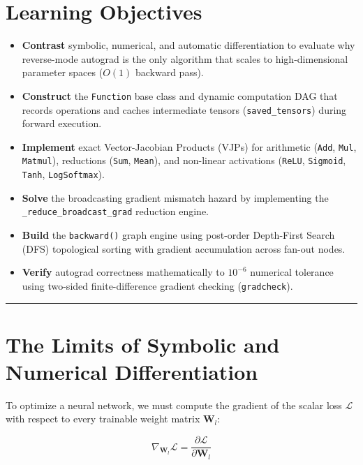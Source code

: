 \documentclass[
  letterpaper,
]{scrbook}
\providecommand{\tightlist}{%
  \setlength{\itemsep}{0pt}\setlength{\parskip}{0pt}}
\begin{document}
\section{Learning Objectives}\label{learning-objectives-6}

\begin{itemize}
\tightlist
\item
  \textbf{Contrast} symbolic, numerical, and automatic differentiation
  to evaluate why reverse-mode autograd is the only algorithm that
  scales to high-dimensional parameter spaces (\(O(1)\) backward pass).
\item
  \textbf{Construct} the \texttt{Function} base class and dynamic
  computation DAG that records operations and caches intermediate
  tensors (\texttt{saved\_tensors}) during forward execution.
\item
  \textbf{Implement} exact Vector-Jacobian Products (VJPs) for
  arithmetic (\texttt{Add}, \texttt{Mul}, \texttt{Matmul}), reductions
  (\texttt{Sum}, \texttt{Mean}), and non-linear activations
  (\texttt{ReLU}, \texttt{Sigmoid}, \texttt{Tanh}, \texttt{LogSoftmax}).
\item
  \textbf{Solve} the broadcasting gradient mismatch hazard by
  implementing the \texttt{\_reduce\_broadcast\_grad} reduction engine.
\item
  \textbf{Build} the \texttt{backward()} graph engine using post-order
  Depth-First Search (DFS) topological sorting with gradient
  accumulation across fan-out nodes.
\item
  \textbf{Verify} autograd correctness mathematically to \(10^{-6}\)
  numerical tolerance using two-sided finite-difference gradient
  checking (\texttt{gradcheck}).
\end{itemize}

\begin{center}\rule{0.5\linewidth}{0.5pt}\end{center}

\section{The Limits of Symbolic and Numerical
Differentiation}\label{the-limits-of-symbolic-and-numerical-differentiation}

To optimize a neural network, we must compute the gradient of the scalar
loss \(\mathcal{L}\) with respect to every trainable weight matrix
\(\mathbf{W}_l\):

\[\nabla_{\mathbf{W}_l} \mathcal{L} = \frac{\partial \mathcal{L}}{\partial \mathbf{W}_l}\]
\end{document}
